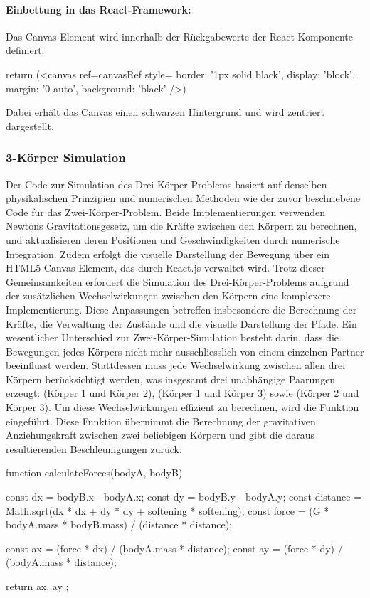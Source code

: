 \documentclass[a4paper,12pt,twoside]{article}
\begin{document}
\paragraph{Einbettung in das React-Framework:}
Das Canvas-Element wird innerhalb der Rückgabewerte der React-Komponente definiert:

\begin{javascript}
return (<canvas ref={canvasRef} style={{ border: '1px solid black', display: 'block', margin: '0 auto', background: 'black' }} />)
\end{javascript}
Dabei erhält das Canvas einen schwarzen Hintergrund und wird zentriert dargestellt.

\subsubsection{3-Körper Simulation}
Der Code zur Simulation des Drei-Körper-Problems basiert auf denselben physikalischen 
Prinzipien und numerischen Methoden wie der zuvor beschriebene Code für das 
Zwei-Körper-Problem. Beide Implementierungen verwenden Newtons Gravitationsgesetz, 
um die Kräfte zwischen den Körpern zu berechnen, und aktualisieren deren Positionen 
und Geschwindigkeiten durch numerische Integration. Zudem erfolgt die visuelle 
Darstellung der Bewegung über ein HTML5-Canvas-Element, das durch React.js verwaltet 
wird. Trotz dieser Gemeinsamkeiten erfordert die Simulation des Drei-Körper-Problems 
aufgrund der zusätzlichen Wechselwirkungen zwischen den Körpern eine komplexere 
Implementierung. Diese Anpassungen betreffen insbesondere die Berechnung der Kräfte, 
die Verwaltung der Zustände und die visuelle Darstellung der Pfade.
Ein wesentlicher Unterschied zur Zwei-Körper-Simulation besteht darin, dass 
die Bewegungen jedes Körpers nicht mehr ausschliesslich von einem einzelnen Partner 
beeinflusst werden. Stattdessen muss jede Wechselwirkung zwischen allen drei Körpern 
berücksichtigt werden, was insgesamt drei unabhängige Paarungen erzeugt: 
(Körper 1 und Körper 2), (Körper 1 und Körper 3) sowie (Körper 2 und Körper 3). 
Um diese Wechselwirkungen effizient zu berechnen, wird die Funktion 
 eingeführt. Diese Funktion übernimmt 
die Berechnung der gravitativen Anziehungskraft zwischen zwei beliebigen Körpern 
und gibt die daraus resultierenden Beschleunigungen zurück:

\begin{javascript}
function calculateForces(bodyA, bodyB) {
    const dx = bodyB.x - bodyA.x;
    const dy = bodyB.y - bodyA.y;
    const distance = Math.sqrt(dx * dx + dy * dy + softening * softening);
    const force = (G * bodyA.mass * bodyB.mass) / (distance * distance);

    const ax = (force * dx) / (bodyA.mass * distance);
    const ay = (force * dy) / (bodyA.mass * distance);

    return { ax, ay };
}
\end{javascript}
\end{document}
